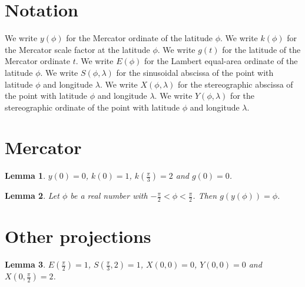 \documentclass{article}
\newtheorem{lemma}{Lemma}
\begin{document}
\section{Notation}

We write $y(\phi)$ for the Mercator ordinate of the latitude $\phi$.
We write $k(\phi)$ for the Mercator scale factor at the latitude $\phi$.
We write $g(t)$ for the latitude of the Mercator ordinate $t$.
We write $E(\phi)$ for the Lambert equal-area ordinate of the latitude $\phi$.
We write $S(\phi,\lambda)$ for the sinusoidal abscissa of the point with latitude $\phi$ and longitude $\lambda$.
We write $X(\phi,\lambda)$ for the stereographic abscissa of the point with latitude $\phi$ and longitude $\lambda$.
We write $Y(\phi,\lambda)$ for the stereographic ordinate of the point with latitude $\phi$ and longitude $\lambda$.

\section{Mercator}

\begin{lemma}\label{mercator}
$y(0)=0$, $k(0)=1$, $k(\frac{\pi}{3})=2$ and $g(0)=0$.
\end{lemma}

\begin{lemma}\label{inverse}
Let $\phi$ be a real number with $-\frac{\pi}{2}<\phi<\frac{\pi}{2}$. Then $g(y(\phi))=\phi$.
\end{lemma}

\section{Other projections}

\begin{lemma}\label{others}
$E(\frac{\pi}{2})=1$, $S(\frac{\pi}{3},2)=1$, $X(0,0)=0$, $Y(0,0)=0$ and $X(0,\frac{\pi}{2})=2$.
\end{lemma}
\end{document}
